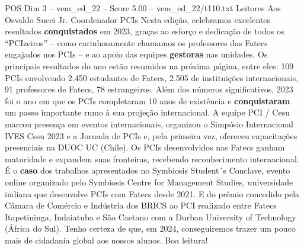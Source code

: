 \begin{textsample}{POS Dim 3 – vem\_ed\_22 – Score 5.00 – vem\_ed\_22/t110.txt}  \label{ex:f3_pos_164}
Leitores Aos Osvaldo Succi Jr.
Coordenador PCIs Nesta edição, celebramos excelentes resultados \textbf{conquistados} em 2023, graças ao esforço e dedicação de todos os “PCIzeiros” – como carinhosamente chamamos os professores das Fatecs engajados nos PCIs – e ao apoio das equipes \textbf{gestoras} nas unidades.
Os principais resultados do ano estão resumidos na próxima página, entre eles: 109 PCIs envolvendo 2.450 estudantes de Fatecs, 2.505 de instituições internacionais, 91 professores de Fatecs, 78 estrangeiros.
Além dos números significativos, 2023 foi o ano em que os PCIs completaram 10 anos de existência e \textbf{conquistaram} um passo importante rumo à sua projeção internacional.
A equipe PCI / Cesu marcou presença em eventos internacionais, organizou o Simpósio Internacional IVES Cesu 2023 e a Jornada de PCIs e, pela primeira vez, ofereceu capacitações presenciais na DUOC UC (Chile).
Os PCIs desenvolvidos nas Fatecs ganham maturidade e expandem suas fronteiras, recebendo reconhecimento internacional.
É o \textbf{caso} dos trabalhos apresentados no Symbiosis Student´s Conclave, evento online organizado pelo Symbiosis Centre for Management Studies, universidade indiana que desenvolve PCIs com Fatecs desde 2021.
E do prêmio concedido pela Câmara de Comércio e Indústria dos BRICS ao PCI realizado entre Fatecs Itapetininga, Indaiatuba e São Caetano com a Durban University of Technology (África do Sul).
Tenho certeza de que, em 2024, conseguiremos trazer um pouco mais de cidadania global aos nossos alunos.
Boa leitura!

\end{textsample}
